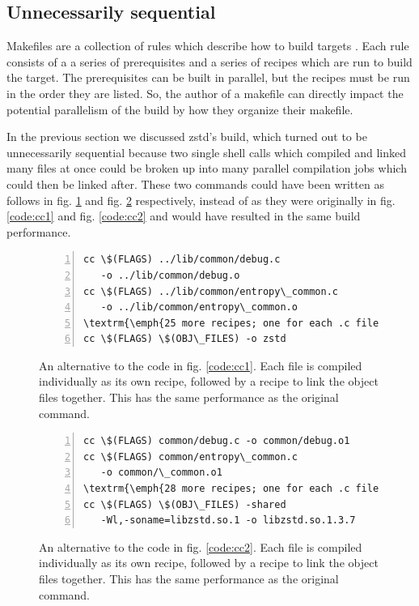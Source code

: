 \documentclass[sigconf,10pt,review,authorversion]{acmart}\settopmatter{printfolios=true,printccs=false,printacmref=false}
\begin{document}
\subsection{Unnecessarily sequential}
\label{sec:sequential}

Makefiles are a collection of rules which describe how to build targets \cite{gnumakemanual}.
Each rule consists
of a a series of prerequisites and a series of recipes which are run to build the target.  The
prerequisites can be built in parallel, but the recipes must be run in the order they are listed.  So,
the author of a makefile can directly impact the potential parallelism of the build by
how they organize their makefile.

In the previous section we discussed zstd's build, which turned out to be unnecessarily sequential
because two single shell calls which compiled and linked many files at once could be broken up
into many parallel compilation jobs which could then be linked after.  These two commands could
have been written as follows in fig. \ref{code:cc5} and fig. \ref{code:cc6} respectively, instead of as they were
originally in fig. \ref{code:cc1} and fig. \ref{code:cc2} and would have resulted in the same
build performance.

\begin{figure}[H]
  \begin{Verbatim}[commandchars=\\\{\},codes={\catcode`$=3\catcode`^=7\catcode`_=8},fontsize=\small,numbers=left,xleftmargin=5mm]
cc \$(FLAGS) ../lib/common/debug.c
   -o ../lib/common/debug.o
cc \$(FLAGS) ../lib/common/entropy\_common.c
   -o ../lib/common/entropy\_common.o
\textrm{\emph{25 more recipes; one for each .c file that needs to be compiled}}
cc \$(FLAGS) \$(OBJ\_FILES) -o zstd
\end{Verbatim}
  \caption{An alternative to the code in fig. \ref{code:cc1}. Each file is compiled individually
    as its own recipe, followed by a recipe to link the object files together.  This has the same
    performance as the original command.}
\label{code:cc5}
\end{figure}

\begin{figure}[H]
  \begin{Verbatim}[commandchars=\\\{\},codes={\catcode`$=3\catcode`^=7\catcode`_=8},fontsize=\small,numbers=left,xleftmargin=5mm]
cc \$(FLAGS) common/debug.c -o common/debug.o1
cc \$(FLAGS) common/entropy\_common.c
   -o common/\_common.o1
\textrm{\emph{28 more recipes; one for each .c file that needs to be compiled}}
cc \$(FLAGS) \$(OBJ\_FILES) -shared
   -Wl,-soname=libzstd.so.1 -o libzstd.so.1.3.7
\end{Verbatim}
  \caption{An alternative to the code in fig. \ref{code:cc2}. Each file is compiled individually
    as its own recipe, followed by a recipe to link the object files together.  This has the same
    performance as the original command.}
\label{code:cc6}
\end{figure}
\end{document}
